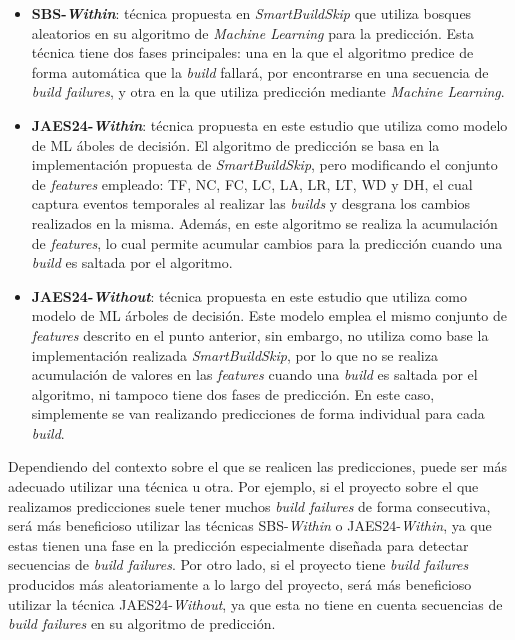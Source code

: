 \begin{itemize}
    \item \textbf{SBS-\textit{Within}}: técnica propuesta en \textit{SmartBuildSkip} que utiliza bosques
    aleatorios en su algoritmo de \textit{Machine Learning} para la predicción. Esta técnica
    tiene dos fases principales: una en la que el algoritmo predice de forma automática que
    la \textit{build} fallará, por encontrarse en una secuencia de \textit{build failures}, y
    otra en la que utiliza predicción mediante \textit{Machine Learning}.\\

    \item \textbf{JAES24-\textit{Within}}: técnica propuesta en este estudio que utiliza como modelo de
    ML áboles de decisión. El algoritmo de predicción se basa en la implementación propuesta de
    \textit{SmartBuildSkip}, pero modificando el conjunto de \textit{features} empleado: TF, NC,
    FC, LC, LA, LR, LT, WD y DH, el cual captura eventos temporales al realizar las \textit{builds}
    y desgrana los cambios realizados en la misma. Además, en este algoritmo se realiza la
    acumulación de \textit{features}, lo cual permite acumular cambios para la predicción cuando
    una \textit{build} es saltada por el algoritmo.\\
    
    \item \textbf{JAES24-\textit{Without}}: técnica propuesta en este estudio que utiliza como modelo de
    ML árboles de decisión. Este modelo emplea el mismo conjunto de \textit{features} descrito en
    el punto anterior, sin embargo, no utiliza como base la implementación realizada
    \textit{SmartBuildSkip}, por lo que no se realiza acumulación de valores en las \textit{features}
    cuando una \textit{build} es saltada por el algoritmo, ni tampoco tiene dos fases de predicción.
    En este caso, simplemente se van realizando predicciones de forma individual para cada
    \textit{build}.
\end{itemize}

Dependiendo del contexto sobre el que se realicen las predicciones, puede ser más adecuado
utilizar una técnica u otra. Por ejemplo, si el proyecto sobre el que realizamos predicciones
suele tener muchos \textit{build failures} de forma consecutiva, será más beneficioso utilizar
las técnicas SBS-\textit{Within} o JAES24-\textit{Within}, ya que estas tienen una fase
en la predicción especialmente diseñada para detectar secuencias de \textit{build failures}. Por
otro lado, si el proyecto tiene \textit{build failures} producidos más aleatoriamente a lo largo
del proyecto, será más beneficioso utilizar la técnica JAES24-\textit{Without}, ya que esta no 
tiene en cuenta secuencias de \textit{build failures} en su algoritmo de predicción.\\

